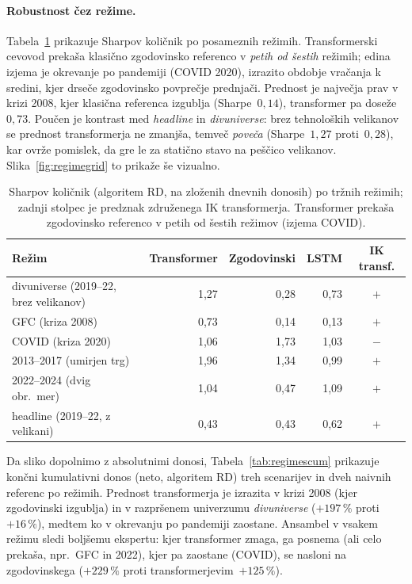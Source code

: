 \paragraph{Robustnost čez režime.}\label{sec:regimes}
Tabela~\ref{tab:regimes} prikazuje Sharpov količnik po posameznih režimih. Transformerski cevovod prekaša klasično zgodovinsko referenco v \emph{petih od šestih} režimih; edina izjema je okrevanje po pandemiji (COVID 2020), izrazito obdobje vračanja k sredini, kjer drseče zgodovinsko povprečje prednjači. Prednost je največja prav v krizi 2008, kjer klasična referenca izgublja (Sharpe~$0{,}14$), transformer pa doseže~$0{,}73$. Poučen je kontrast med \emph{headline} in \emph{divuniverse}: brez tehnoloških velikanov se prednost transformerja ne zmanjša, temveč \emph{poveča} (Sharpe~$1{,}27$ proti~$0{,}28$), kar ovrže pomislek, da gre le za statično stavo na peščico velikanov. Slika~\ref{fig:regimegrid} to prikaže še vizualno.

\begin{table}[htbp]
  \centering
  \caption{Sharpov količnik (algoritem RD, na zloženih dnevnih donosih) po tržnih režimih; zadnji stolpec je predznak združenega IK transformerja. Transformer prekaša zgodovinsko referenco v petih od šestih režimov (izjema COVID).}
  \label{tab:regimes}
  \begin{tabular}{lrrrc}
    \toprule
    Režim & Transformer & Zgodovinski & LSTM & IK transf.\\
    \midrule
    divuniverse (2019--22, brez velikanov) & 1{,}27 & 0{,}28 & 0{,}73 & $+$\\
    GFC (kriza 2008)                       & 0{,}73 & 0{,}14 & 0{,}13 & $+$\\
    COVID (kriza 2020)                     & 1{,}06 & 1{,}73 & 1{,}03 & $-$\\
    2013--2017 (umirjen trg)               & 1{,}96 & 1{,}34 & 0{,}99 & $+$\\
    2022--2024 (dvig obr.\ mer)            & 1{,}04 & 0{,}47 & 1{,}09 & $+$\\
    headline (2019--22, z velikani)        & 0{,}43 & 0{,}43 & 0{,}62 & $+$\\
    \bottomrule
  \end{tabular}
\end{table}

Da sliko dopolnimo z absolutnimi donosi, Tabela~\ref{tab:regimescum} prikazuje končni kumulativni donos (neto, algoritem RD) treh scenarijev in dveh naivnih referenc po režimih. Prednost transformerja je izrazita v krizi 2008 (kjer zgodovinski izgublja) in v razpršenem univerzumu \emph{divuniverse} ($+197\,\%$ proti~$+16\,\%$), medtem ko v okrevanju po pandemiji zaostane. Ansambel v vsakem režimu sledi boljšemu ekspertu: kjer transformer zmaga, ga posnema (ali celo prekaša, npr.\ GFC in 2022), kjer pa zaostane (COVID), se nasloni na zgodovinskega ($+229\,\%$ proti transformerjevim~$+125\,\%$).

